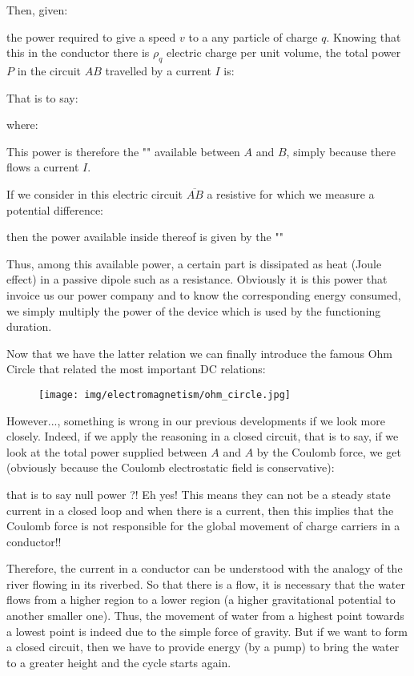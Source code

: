 	Then, given:
	
	the power required to give a speed $v$ to a any particle of charge $q$. Knowing that this in the conductor there is $\rho_q$ electric charge per unit volume, the total power $P$ in the circuit $AB$ travelled by a current $I$ is:
	
	That is to say:
	
	where:
	
	This power is therefore the "\label{electric power}" available between $A$ and $B$, simply because there flows a current $I$.

	If we consider in this electric circuit $\overline{AB}$ a resistive for which we measure a potential difference:
	
	then the power available inside thereof is given by the ""
	
	Thus, among this available power, a certain part is dissipated as heat (Joule effect) in a passive dipole such as a resistance. Obviously it is this power that invoice us our power company and to know the corresponding energy consumed, we simply multiply the power of the device which is used by the functioning duration.
	
	Now that we have the latter relation we can finally introduce the famous Ohm Circle that related the most important DC relations:
	\begin{figure}[H]
		\centering
		\texttt{[image: img/electromagnetism/ohm\_circle.jpg]}
	\end{figure}
	However..., something is wrong in our previous developments if we look more closely. Indeed, if we apply the reasoning in a closed circuit, that is to say, if we look at the total power supplied between $A$ and $A$ by the Coulomb force, we get (obviously because the Coulomb electrostatic field is conservative):
	
	that is to say null power ?! Eh yes! This means they can not be a steady state current in a closed loop and when there is a current, then this implies that the Coulomb force is not responsible for the global movement of charge carriers in a conductor!!

	Therefore, the current in a conductor can be understood with the analogy of the river flowing in its riverbed. So that there is a flow, it is necessary that the water flows from a higher region to a lower region (a higher gravitational potential to another smaller one). Thus, the movement of water from a highest point towards a lowest point is indeed due to the simple force of gravity. But if we want to form a closed circuit, then we have to provide energy (by a pump) to bring the water to a greater height and the cycle starts again.
	
